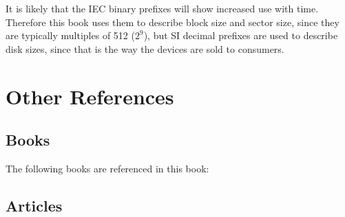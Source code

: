 It is likely that the IEC binary prefixes will show increased use
with time. Therefore this book uses them to describe block size and
sector size, since they are typically multiples of 512 ($2^9$), but 
SI decimal prefixes are used to describe disk sizes, since that is the way
the devices are sold to consumers.

\section{Other References}
\subsection{Books}\label{section:books}
The following books are referenced in this book:

\printbibliography[heading=bibempty,type=book]


\cite{carrier-file-systems}
\subsection{Articles}
